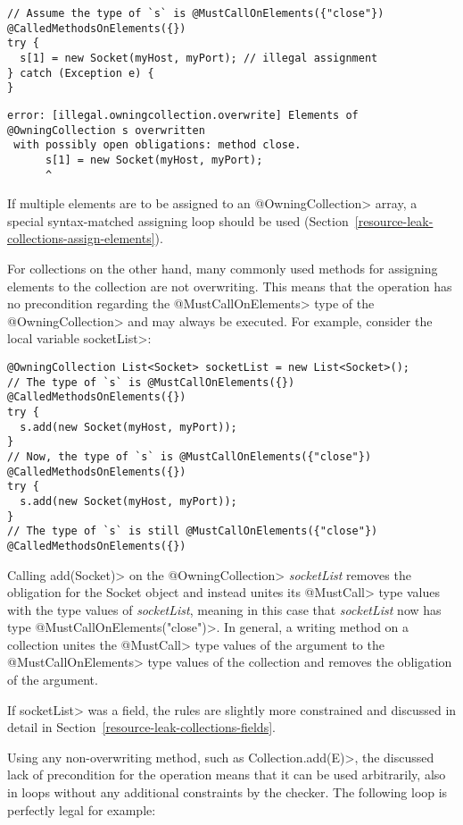 \begin{verbatim}
// Assume the type of `s` is @MustCallOnElements({"close"}) @CalledMethodsOnElements({})
try {
  s[1] = new Socket(myHost, myPort); // illegal assignment
} catch (Exception e) {
}
\end{verbatim}

\begin{verbatim}
error: [illegal.owningcollection.overwrite] Elements of @OwningCollection s overwritten
 with possibly open obligations: method close.
      s[1] = new Socket(myHost, myPort);
      ^
\end{verbatim}

If multiple elements are to be assigned to an \<@OwningCollection> array, a special syntax-matched assigning loop should be used (Section~\ref{resource-leak-collections-assign-elements}).

For collections on the other hand, many commonly used methods for assigning elements to the collection are not overwriting. This means that the operation has no precondition regarding the \<@MustCallOnElements> type of the \<@OwningCollection> and may always be executed. For example, consider the local variable \<socketList>:

\begin{verbatim}
@OwningCollection List<Socket> socketList = new List<Socket>();
// The type of `s` is @MustCallOnElements({}) @CalledMethodsOnElements({})
try {
  s.add(new Socket(myHost, myPort));
}
// Now, the type of `s` is @MustCallOnElements({"close"}) @CalledMethodsOnElements({})
try {
  s.add(new Socket(myHost, myPort));
}
// The type of `s` is still @MustCallOnElements({"close"}) @CalledMethodsOnElements({})
\end{verbatim}

Calling \<add(Socket)> on the \<@OwningCollection> \textit{socketList} removes the obligation for the Socket object and instead unites its \<@MustCall> type values with the \MustCallOnElements type values of \textit{socketList}, meaning in this case that \textit{socketList} now has type  \<@MustCallOnElements({"close"})>. In general, a writing method on a collection unites the \<@MustCall> type values of the argument to the \<@MustCallOnElements> type values of the collection and removes the obligation of the argument.

If \<socketList> was a field, the rules are slightly more constrained and discussed in detail in Section~\ref{resource-leak-collections-fields}.

Using any non-overwriting method, such as \<Collection.add(E)>, the discussed lack of precondition for the operation means that it can be used arbitrarily, also in loops without any additional constraints by the checker. The following loop is perfectly legal for example:

